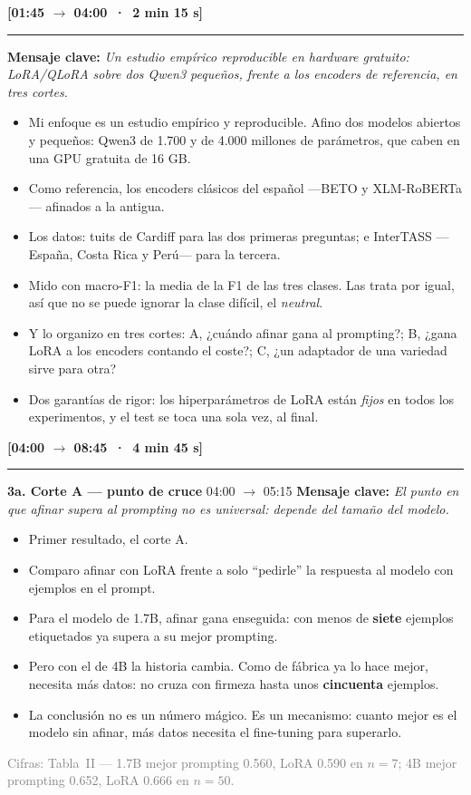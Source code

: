 \documentclass[11pt,a4paper]{article}
\newcommand{\bloque}[2]{\medskip\noindent{\large\textbf{\textcolor{blue!45!black}{#1}}}\hfill{\small\textbf{[#2]}}\par
  \nopagebreak\rule{\linewidth}{0.4pt}\par\nopagebreak\smallskip}
\newcommand{\clave}[1]{\noindent\textbf{Mensaje clave:} \emph{#1}\par\smallskip}
\newcommand{\visual}[1]{\noindent{\footnotesize\textcolor{teal!60!black}{$\square$~[apoyo visual]: #1}}\par\smallskip}
\newcommand{\fuente}[1]{\par{\footnotesize\textcolor{gray}{Cifras: #1}}\par}
\newenvironment{decir}{\begin{itemize}[label=\textbf{--},leftmargin=1.3em,itemsep=2.5pt,topsep=3pt]}{\end{itemize}}
\begin{document}
\bloque{2. Método / Propuesta}{01:45 $\rightarrow$ 04:00 \,·\, 2 min 15 s}
\clave{Un estudio empírico reproducible en hardware gratuito: LoRA/QLoRA sobre dos Qwen3 pequeños, frente a los encoders de referencia, en tres cortes.}
\visual{Diagrama: modelos (Qwen3 1.7B/4B) · datasets (Cardiff, InterTASS) · los 3 cortes A/B/C.}
\begin{decir}
  \item Mi enfoque es un estudio empírico y reproducible. Afino dos modelos abiertos y pequeños: Qwen3 de 1.700 y de 4.000 millones de parámetros, que caben en una GPU gratuita de 16 GB.
  \item Como referencia, los encoders clásicos del español ---BETO y XLM-RoBERTa--- afinados a la antigua.
  \item Los datos: tuits de Cardiff para las dos primeras preguntas; e InterTASS ---España, Costa Rica y Perú--- para la tercera.
  \item Mido con macro-F1: la media de la F1 de las tres clases. Las trata por igual, así que no se puede ignorar la clase difícil, el \emph{neutral}.
  \item Y lo organizo en tres cortes: A, ¿cuándo afinar gana al prompting?; B, ¿gana LoRA a los encoders contando el coste?; C, ¿un adaptador de una variedad sirve para otra?
  \item Dos garantías de rigor: los hiperparámetros de LoRA están \emph{fijos} en todos los experimentos, y el test se toca una sola vez, al final.
\end{decir}

\bloque{3. Resultados}{04:00 $\rightarrow$ 08:45 \,·\, 4 min 45 s}

\noindent\textbf{3a. Corte A --- punto de cruce} \hfill {\small 04:00 $\rightarrow$ 05:15}
\clave{El punto en que afinar supera al prompting no es universal: depende del tamaño del modelo.}
\visual{Figura A: macro-F1 vs n (escala log), con el cruce marcado para 1.7B y 4B.}
\begin{decir}
  \item Primer resultado, el corte A.
  \item Comparo afinar con LoRA frente a solo ``pedirle'' la respuesta al modelo con ejemplos en el prompt.
  \item Para el modelo de 1.7B, afinar gana enseguida: con menos de \textbf{siete} ejemplos etiquetados ya supera a su mejor prompting.
  \item Pero con el de 4B la historia cambia. Como de fábrica ya lo hace mejor, necesita más datos: no cruza con firmeza hasta unos \textbf{cincuenta} ejemplos.
  \item La conclusión no es un número mágico. Es un mecanismo: cuanto mejor es el modelo sin afinar, más datos necesita el fine-tuning para superarlo.
\end{decir}
\fuente{Tabla~II --- 1.7B mejor prompting 0.560, LoRA 0.590 en $n{=}7$; 4B mejor prompting 0.652, LoRA 0.666 en $n{=}50$.}
\end{document}
